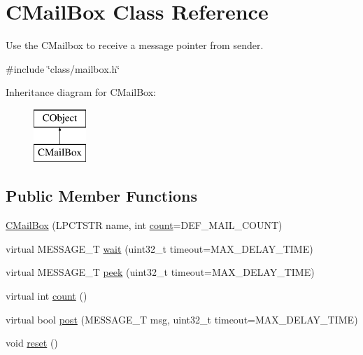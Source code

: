 \hypertarget{class_c_mail_box}{\section{C\-Mail\-Box Class Reference}
\label{class_c_mail_box}
}


Use the C\-Mailbox to receive a message pointer from sender.  




{\ttfamily \#include \char`\"{}class/mailbox.\-h\char`\"{}}

Inheritance diagram for C\-Mail\-Box\-:\begin{figure}[H]
\begin{center}
\leavevmode
\includegraphics[height=2.000000cm]{d8/d26/class_c_mail_box}
\end{center}
\end{figure}
\subsection*{Public Member Functions}
\begin{DoxyCompactItemize}
\item 
\hyperlink{class_c_mail_box_a860c64ec622b6bb2641f8e69748ba9e6}{C\-Mail\-Box} (L\-P\-C\-T\-S\-T\-R name, int \hyperlink{class_c_mail_box_a11592da3e55cf9bedc8d2cf36d56e9bd}{count}=D\-E\-F\-\_\-\-M\-A\-I\-L\-\_\-\-C\-O\-U\-N\-T)
\item 
virtual M\-E\-S\-S\-A\-G\-E\-\_\-\-T \hyperlink{class_c_mail_box_ad03ed94ae07a9309d9f42695c9df7e94}{wait} (uint32\-\_\-t timeout=M\-A\-X\-\_\-\-D\-E\-L\-A\-Y\-\_\-\-T\-I\-M\-E)
\item 
virtual M\-E\-S\-S\-A\-G\-E\-\_\-\-T \hyperlink{class_c_mail_box_adc923a33209756bb2ed9e1838b12b68c}{peek} (uint32\-\_\-t timeout=M\-A\-X\-\_\-\-D\-E\-L\-A\-Y\-\_\-\-T\-I\-M\-E)
\item 
virtual int \hyperlink{class_c_mail_box_a11592da3e55cf9bedc8d2cf36d56e9bd}{count} ()
\item 
virtual bool \hyperlink{class_c_mail_box_a5ab581cd317944e824efbbc6f7f4d14d}{post} (M\-E\-S\-S\-A\-G\-E\-\_\-\-T msg, uint32\-\_\-t timeout=M\-A\-X\-\_\-\-D\-E\-L\-A\-Y\-\_\-\-T\-I\-M\-E)
\item 
void \hyperlink{class_c_mail_box_a73d5b694b1e7ce4e05c7ccc8f1dfd695}{reset} ()
\end{DoxyCompactItemize}
